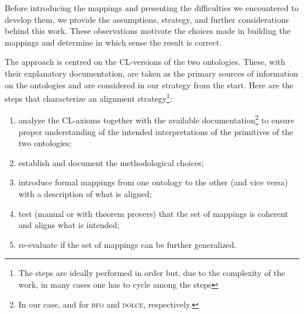 \documentclass[ao]{iosart2x}
\newcommand{\nb}[1]{\textcolor{red}{$|$}\marginpar{\hspace*{-0cm}\parbox{20mm}{\scriptsize\raggedright\textcolor{red}{#1}}}}
\newcommand{\dolce}{{\textsc{dolce}}}
\newcommand{\bfo}{{\textsc{bfo}}}
\begin{document}
Before introducing the mappings and presenting the difficulties we encountered to develop them, we provide the assumptions, strategy, and further considerations behind this work. These observations motivate the choices made in building the mappings and determine in which sense the result is correct.

The approach is centred on the CL-versions of the two ontologies. These, with their explanatory documentation, are taken as the primary sources of information on the ontologies and are considered in our strategy from the start. 
Here are the steps that characterize an alignment strategy\footnote{The steps are ideally performed in order but, due to the complexity of the work, in many cases one has to cycle among the steps}:
\begin{enumerate}[({\bf S}1)]
\item analyze the CL-axioms together with the available documentation\footnote{In our case, \citep{barryBasicFormalOntology2015} and \citep{D18} for {\bfo} and {\dolce}, respectively.} %
to ensure proper understanding of the intended interpretations of the primitives of the two ontologies; %
 \item establish and document the methodological choices;
\item introduce formal mappings from one ontology to the other (and vice versa) with a description of what is aligned;
\item test (manual or with theorem provers) that the set of mappings is coherent and aligns what is intended;
\item re-evaluate if the set of mappings can be further generalized.
\end{enumerate}
\end{document}
